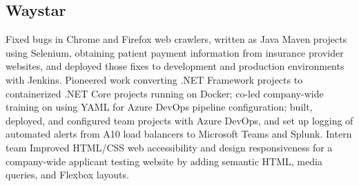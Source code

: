 

\subsection{Waystar}
{Fixed bugs in Chrome and Firefox web crawlers, written as Java Maven projects using Selenium, obtaining patient payment information from insurance provider websites, and deployed those fixes to development and production environments with Jenkins.
}
{Pioneered work converting .NET Framework projects to containerized .NET Core projects running on Docker; co-led company-wide training on using YAML for Azure DevOps pipeline configuration; built, deployed, and configured team projects with Azure DevOps, and set up logging of automated alerts from A10 load balancers to Microsoft Teams and Splunk.
}
{Intern team}
{}
{Improved HTML/CSS web accessibility and design responsiveness for a company-wide applicant testing website by adding semantic HTML, media queries, and Flexbox layouts. }
